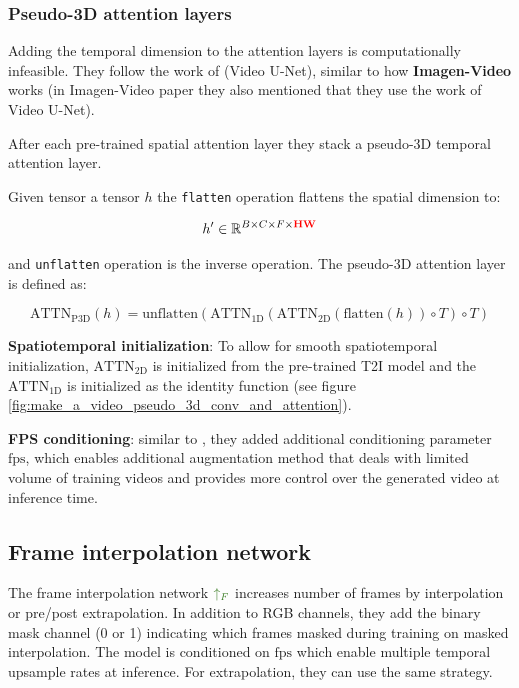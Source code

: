 \subsubsection{Pseudo-3D attention layers}

Adding the temporal dimension to the attention layers is computationally infeasible. They follow the work of \cite{video_diffusion_models} (Video U-Net), similar to how \textbf{Imagen-Video} works (in Imagen-Video paper they also mentioned that they use the work of Video U-Net).

After each pre-trained spatial attention layer they stack a pseudo-3D temporal attention layer. 

Given tensor a tensor $h$ the \texttt{flatten} operation flattens the spatial dimension to: 

\[ 
h' \in \mathbb{R}^{B\times C\times F\times \mathbf{\textcolor{red}{HW}}} 
\] 

and \texttt{unflatten} operation is the inverse operation. The pseudo-3D attention layer is defined as:

\[ \text{ATTN}_{\text{P3D}} (h) = \text{unflatten} 
(\text{ATTN}_{\text{1D}} 
(\text{ATTN}_{\text{2D}} 
(\text{flatten} (h)) \circ T) \circ T) 
\]

\textbf{Spatiotemporal initialization}: To allow for smooth spatiotemporal initialization, $\text{ATTN}_{\text{2D}}$ is initialized from the pre-trained T2I model and the $\text{ATTN}_{\text{1D}}$ is initialized as the identity function (see figure \ref{fig:make_a_video_pseudo_3d_conv_and_attention}).

\textbf{FPS conditioning}: similar to \cite{cogvideo}, they added additional conditioning parameter $\text{fps}$, which enables additional augmentation method that deals with limited volume of training videos and provides more control over the generated video at inference time.





\subsection{Frame interpolation network}

The frame interpolation network $\textcolor{OliveGreen}{\uparrow_F}$ increases number of frames by interpolation or pre/post extrapolation. In addition to RGB channels, they add the binary mask channel (0 or 1) indicating which frames masked during training on masked interpolation. The model is conditioned on $\text{fps}$ which enable multiple temporal upsample rates at inference. For extrapolation, they can use the same strategy.




